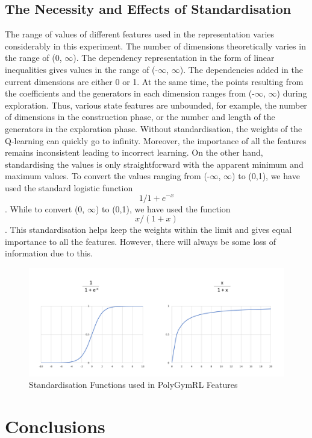 \documentclass[logo,msc]{infthesis}           %
\begin{document}
\section{The Necessity and Effects of Standardisation}
\label{sec:std}
The range of values of different features used in the representation varies considerably in this experiment. The number of dimensions theoretically varies in the range of (0, $\infty$). The dependency representation in the form of linear inequalities gives values in the range of (-$\infty$, $\infty$). The dependencies added in the current dimensions are either 0 or 1. At the same time, the points resulting from the coefficients and the generators in each dimension ranges from (-$\infty$, $\infty$) during exploration. Thus, various state features are unbounded, for example, the number of dimensions in the construction phase, or the number and length of the generators in the exploration phase. Without standardisation, the weights of the Q-learning can quickly go to infinity. Moreover, the importance of all the features remains inconsistent leading to incorrect learning. On the other hand, standardising the values is only straightforward with the apparent minimum and maximum values. To convert the values ranging from (-$\infty$, $\infty$) to (0,1), we have used the standard logistic function \[{1/1+e^{-x}}\]. While to convert (0, $\infty$) to (0,1), we have used the function \[{x / (1 + x)}\]. This standardisation helps keep the weights within the limit and gives equal importance to all the features. However, there will always be some loss of information due to this.

\begin{figure}
  \centering
  \includegraphics[width=\textwidth]{Images/Standardisation.png}    
  \caption{Standardisation Functions used in PolyGymRL Features}
  \label{fig:Standardisation}
\end{figure}


\chapter{Conclusions}
\end{document}
